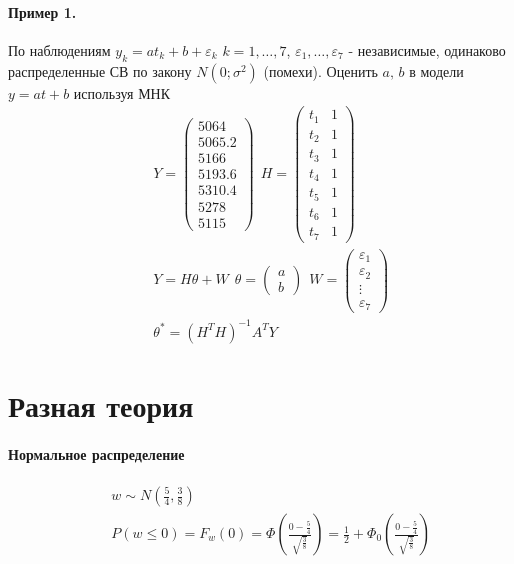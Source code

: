 \documentclass[12pt]{extarticle}
\begin{document}
\paragraph{Пример 1.}
По наблюдениям $y_{k}=at_{k}+b+\varepsilon_{k}$ $k=1,\ldots,7$,
$\varepsilon_{1},\ldots,\varepsilon_{7}$ - независимые, одинаково
распределенные СВ по закону $N(0;\sigma^{2})$ (помехи). Оценить $a,\,b$
в модели $y=at+b$ используя МНК
\begin{eqnarray*}
    &&Y=\left(\begin{array}{c}
            5064\\5065.2\\5166\\5193.6\\5310.4\\5278\\5115
    \end{array} \right)
    \ \ H=\left(\begin{array}{cc}
            t_{1}&1 \\ t_{2} & 1\\ t_{3} & 1\\ t_{4} & 1 \\ t_{5} & 1\\
            t_{6} & 1 \\t_{7} & 1
    \end{array} \right)\\
    &&Y=H\theta + W
    \ \ \theta=\left(\begin{array}{c}a\\b \end{array}\right)
    \ \ W=\left(\begin{array}{c}
            \varepsilon_{1}\\\varepsilon_{2}\\\vdots\\\varepsilon_{7}
    \end{array} \right)\\
    &&\theta^{*}=(H^{T}H)^{-1}A^{T}Y
\end{eqnarray*}


\section{Разная теория}
\paragraph{Нормальное распределение}
\begin{eqnarray*}
    &&w\sim N\left(\frac{5}{4}, \frac{3}{8}\right)\\
    &&P(w\leqslant
    0)=F_{w}(0)=\Phi\left(\frac{0-\frac{5}{4}}{\sqrt{\frac{3}{8}}}\right)
    =\frac{1}{2}+\Phi_{0}\left(\frac{0-\frac{5}{4}}{\sqrt{\frac{3}{8}}}\right)
\end{eqnarray*}
\end{document}
